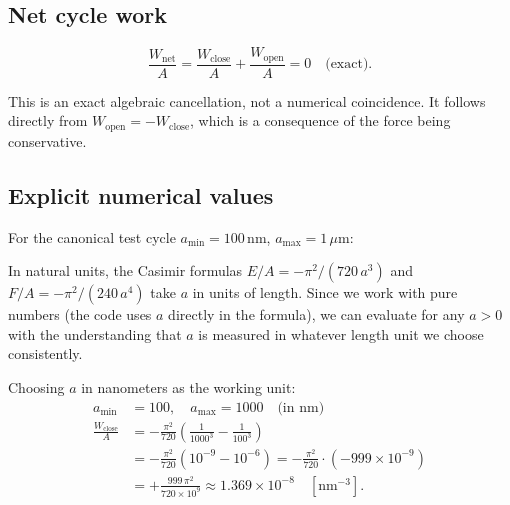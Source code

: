 \documentclass[11pt]{article}
\begin{document}

\subsection{Net cycle work}

\begin{equation}
  \boxed{
    \frac{W_\mathrm{net}}{A}
    = \frac{W_\mathrm{close}}{A} + \frac{W_\mathrm{open}}{A}
    = 0 \quad \text{(exact)}.
  }
  \label{eq:wnet}
\end{equation}

This is an exact algebraic cancellation, not a numerical coincidence.
It follows directly from $W_\mathrm{open} = -W_\mathrm{close}$,
which is a consequence of the force being conservative.

\subsection{Explicit numerical values}

For the canonical test cycle $a_\mathrm{min} = 100\,\mathrm{nm}$,
$a_\mathrm{max} = 1\,\mu\mathrm{m}$:

In natural units, the Casimir formulas $E/A = -\pi^2/(720\,a^3)$
and $F/A = -\pi^2/(240\,a^4)$ take $a$ in units of length.
Since we work with pure numbers (the code uses $a$ directly
in the formula), we can evaluate for any $a > 0$ with the
understanding that $a$ is measured in whatever length unit
we choose consistently.

Choosing $a$ in nanometers as the working unit:
\begin{align}
  a_\mathrm{min} &= 100, \quad a_\mathrm{max} = 1000 \quad
  \text{(in nm)} \\[6pt]
  \frac{W_\mathrm{close}}{A}
  &= -\frac{\pi^2}{720}\left(\frac{1}{1000^3} - \frac{1}{100^3}\right)
  \nonumber \\
  &= -\frac{\pi^2}{720}\left(10^{-9} - 10^{-6}\right)
  = -\frac{\pi^2}{720}\cdot(-999 \times 10^{-9})
  \nonumber \\
  &= +\frac{999\,\pi^2}{720 \times 10^9}
  \approx 1.369 \times 10^{-8} \quad [\text{nm}^{-3}].
  \label{eq:wclose-numerical}
\end{align}

\end{document}
